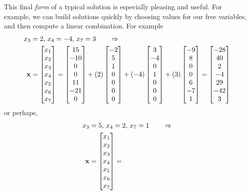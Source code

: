 \documentclass{ximera}
\begin{document}
\begin{example}
  This final \textit{form} of a typical solution is especially
  pleasing and useful.  For example, we can build solutions quickly by
  choosing values for our free variables, and then compute a linear
  combination.  For example
  \begin{align*}
    x_3&=2,\,
         x_4=-4,\,
         x_7=3
         \quad\quad\Rightarrow\\
    \mathbf{x}&=
              \begin{bmatrix}x_1\\x_2\\x_3\\x_4\\x_5\\x_6\\x_7\end{bmatrix}=
    \begin{bmatrix}15\\ -10\\ 0\\ 0\\ 11\\ -21\\ 0\end{bmatrix}+
    (2)\begin{bmatrix}-2\\ 5\\ 1\\ 0\\ 0\\ 0\\ 0\end{bmatrix}+
    (-4)\begin{bmatrix}3\\ -4\\ 0\\ 1\\ 0\\ 0\\ 0\end{bmatrix}+
    (3)\begin{bmatrix}-9\\ 8\\ 0\\ 0\\ 6\\ -7\\ 1\end{bmatrix}
    =
    \begin{bmatrix}-28\\40\\2\\-4\\29\\-42\\3\end{bmatrix}
  \end{align*}
  or perhaps,
  \begin{align*}
    x_3&=5,\,
         x_4=2,\,
         x_7=1
         \quad\quad\Rightarrow\\
    \vect{x}&=
              \colvector{x_1\\x_2\\x_3\\x_4\\x_5\\x_6\\x_7}=

\end{align*}
\end{example}
\end{document}
